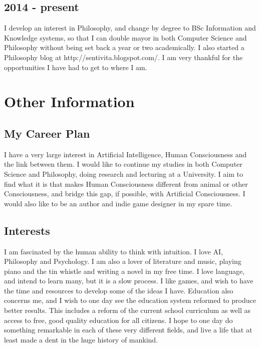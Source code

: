 	\subsection*{2014 - present}
		I develop an interest in Philosophy, and change by degree to BSc Information and Knowledge systems, so that I can double mayor in both Computer Science and Philosophy without being set back a year or two academically. I also started a Philosophy blog at http://sentivita.blogspot.com/. I am very thankful for the opportunities I have had to get to where I am.
\newpage
\section*{Other Information}

	\subsection*{My Career Plan}

	 I have a very large interest in Artificial Intelligence, Human Consciousness and the link between them. I would like to continue my studies in both Computer Science and Philosophy, doing research and lecturing at a University. I aim to find what it is that makes Human Consciousness different from animal or other Consciousness, and bridge this gap, if possible, with Artificial Consciousness. I would also like to be an author and indie game designer in my spare time.

	\subsection*{Interests}

	I am fascinated by the human ability to think with intuition. I love AI, Philosophy and Psychology. I am also a lover of literature and music, playing piano and the tin whistle and writing a novel in my free time. I love language, and intend to learn many, but it is a slow process. I like games, and wish to have the time and resources to develop some of the ideas I have. Education also concerns me, and I wish to one day see the education system reformed to produce better results. This includes a reform of the current school curriculum as well as access to free, good quality education for all citizens. I hope to one day do something remarkable in each of these very different fields, and live a life that at least made a dent in the huge history of mankind.
%